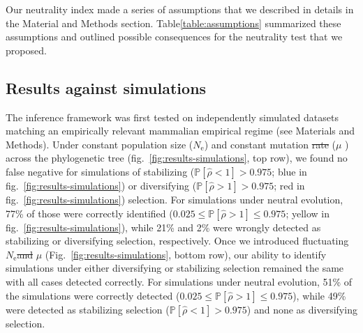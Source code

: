 \documentclass{article}
\newcommand{\Ne}{N_{\text{e}}}
\newcommand{\proba}{\mathbb{P}}
\newcommand{\MutationRatePheno}{\mu}
\newcommand{\MutationRateNuc}{u} %
\newcommand{\EstNI}{\widehat{\rho}}
\providecommand{\DIFaddtex}[1]{{\protect\color{blue}\uwave{#1}}} %
\providecommand{\DIFdeltex}[1]{{\protect\color{red}\sout{#1}}}                      %
\providecommand{\DIFaddbegin}{} %
\providecommand{\DIFaddend}{} %
\providecommand{\DIFdelbegin}{} %
\providecommand{\DIFdelend}{} %
\providecommand{\DIFadd}[1]{\texorpdfstring{\DIFaddtex{#1}}{#1}} %
\providecommand{\DIFdel}[1]{\texorpdfstring{\DIFdeltex{#1}}{}} %
\newcommand{\DIFscaledelfig}{0.5}
\newlength{\DIFdelgraphicswidth} %
\newlength{\DIFdelgraphicsheight} %
\newcommand{\DIFaddincludegraphics}[2][]{{\color{blue}\fbox{\DIFOincludegraphics[#1]{#2}}}} %
\newcommand{\DIFdelincludegraphics}[2][]{%
\sbox{\DIFdelgraphicsbox}{\DIFOincludegraphics[#1]{#2}}%
\settoboxwidth{\DIFdelgraphicswidth}{\DIFdelgraphicsbox} %
\settoboxtotalheight{\DIFdelgraphicsheight}{\DIFdelgraphicsbox} %
\scalebox{\DIFscaledelfig}{%
\parbox[b]{\DIFdelgraphicswidth}{\usebox{\DIFdelgraphicsbox}\\[-\baselineskip] \rule{\DIFdelgraphicswidth}{0em}}\llap{\resizebox{\DIFdelgraphicswidth}{\DIFdelgraphicsheight}{%
\setlength{\unitlength}{\DIFdelgraphicswidth}%
\begin{picture}(1,1)%
\thicklines\linethickness{2pt} %
{\color[rgb]{1,0,0}\put(0,0){\framebox(1,1){}}}%
{\color[rgb]{1,0,0}\put(0,0){\line( 1,1){1}}}%
{\color[rgb]{1,0,0}\put(0,1){\line(1,-1){1}}}%
\end{picture}%
}\hspace*{3pt}}} %
} %
\DeclareRobustCommand{\DIFaddbegin}{\DIFOaddbegin \let\includegraphics\DIFaddincludegraphics} %
\DeclareRobustCommand{\DIFaddend}{\DIFOaddend \let\includegraphics\DIFOincludegraphics} %
\DeclareRobustCommand{\DIFdelbegin}{\DIFOdelbegin \let\includegraphics\DIFdelincludegraphics} %
\DeclareRobustCommand{\DIFdelend}{\DIFOaddend \let\includegraphics\DIFOincludegraphics} %
\begin{document}
Our neutrality index made a series of assumptions that we described in details in the Material and Methods section.
Table\DIFaddbegin \DIFadd{~}\DIFaddend \ref{table:assumptions} summarized these assumptions and outlined possible consequences for the neutrality test that we proposed.

\subsection*{Results against simulations}\label{subsec:results-against-simulations}

The inference framework was first tested on independently simulated datasets matching an empirically relevant mammalian empirical regime (see Materials and Methods).
Under constant population size ($\Ne$) and constant mutation \DIFdelbegin \DIFdel{rate }\DIFdelend \DIFaddbegin \DIFadd{rates }\DIFaddend ($\MutationRatePheno$ \DIFaddbegin \DIFadd{and $\MutationRateNuc$}\DIFaddend ) across the phylogenetic tree (fig.~\ref{fig:results-simulations}, top row), we found no false negative for simulations of stabilizing ($\proba [\EstNI < 1] > 0.975$; blue in fig.~\ref{fig:results-simulations}) or diversifying ($\proba [\EstNI > 1] > 0.975$; red in fig.~\ref{fig:results-simulations}) selection.
For simulations under neutral evolution, 77\% of those were correctly identified ($0.025 \leq \proba [\EstNI > 1] \leq 0.975$; yellow in fig.~\ref{fig:results-simulations}), while 21\% and 2\% were wrongly detected as stabilizing or diversifying selection, respectively.
Once we introduced fluctuating $\Ne$\DIFdelbegin \DIFdel{and }\DIFdelend \DIFaddbegin \DIFadd{, }\DIFaddend $\MutationRatePheno$ \DIFaddbegin \DIFadd{and $\MutationRateNuc$}\DIFaddend (Fig.~\ref{fig:results-simulations}, bottom row), our ability to identify simulations under either diversifying or stabilizing selection remained the same with all cases detected correctly.
For simulations under neutral evolution, 51\% of the simulations were correctly detected ($0.025 \leq \proba [\EstNI > 1] \leq 0.975$), while 49\% were detected as stabilizing selection ($\proba [\EstNI < 1] > 0.975$) and none as diversifying selection.
\end{document}
